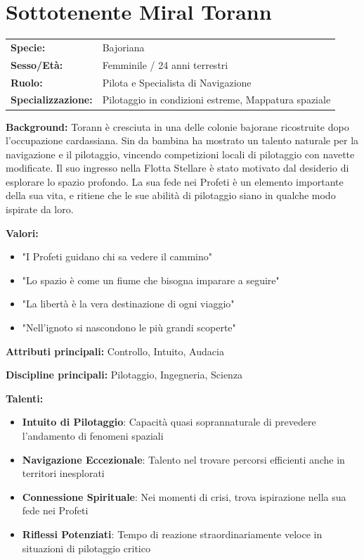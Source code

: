 \documentclass[11pt,a4paper]{article}
\begin{document}
\section{Sottotenente Miral Torann}

\begin{tcolorbox}[colback=fedlightblue!10, colframe=fedblue]
\begin{tabularx}{\textwidth}{lX}
\textbf{Specie:} & Bajoriana \\
\textbf{Sesso/Età:} & Femminile / 24 anni terrestri \\
\textbf{Ruolo:} & Pilota e Specialista di Navigazione \\
\textbf{Specializzazione:} & Pilotaggio in condizioni estreme, Mappatura spaziale \\
\end{tabularx}

\textbf{Background:} Torann è cresciuta in una delle colonie bajorane ricostruite dopo l'occupazione cardassiana. Sin da bambina ha mostrato un talento naturale per la navigazione e il pilotaggio, vincendo competizioni locali di pilotaggio con navette modificate. Il suo ingresso nella Flotta Stellare è stato motivato dal desiderio di esplorare lo spazio profondo. La sua fede nei Profeti è un elemento importante della sua vita, e ritiene che le sue abilità di pilotaggio siano in qualche modo ispirate da loro.

\textbf{Valori:}
\begin{itemize}[leftmargin=*]
\item "I Profeti guidano chi sa vedere il cammino"
\item "Lo spazio è come un fiume che bisogna imparare a seguire"
\item "La libertà è la vera destinazione di ogni viaggio"
\item "Nell'ignoto si nascondono le più grandi scoperte"
\end{itemize}

\textbf{Attributi principali:} Controllo, Intuito, Audacia

\textbf{Discipline principali:} Pilotaggio, Ingegneria, Scienza

\textbf{Talenti:}
\begin{itemize}[leftmargin=*]
\item \textbf{Intuito di Pilotaggio}: Capacità quasi soprannaturale di prevedere l'andamento di fenomeni spaziali
\item \textbf{Navigazione Eccezionale}: Talento nel trovare percorsi efficienti anche in territori inesplorati
\item \textbf{Connessione Spirituale}: Nei momenti di crisi, trova ispirazione nella sua fede nei Profeti
\item \textbf{Riflessi Potenziati}: Tempo di reazione straordinariamente veloce in situazioni di pilotaggio critico
\end{itemize}
\end{tcolorbox}
\end{document}
